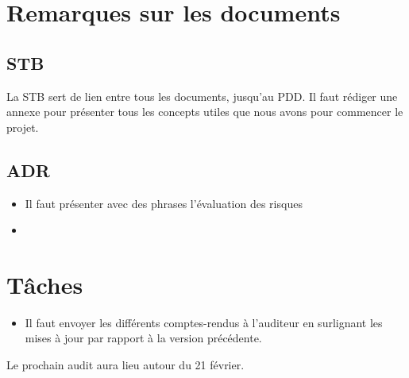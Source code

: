 \documentclass[a4paper,11pt,french]{article}
\begin{document}
\section{Remarques sur les documents}
\subsection{STB}
La STB sert de lien entre tous les documents, jusqu'au PDD.
Il faut rédiger une annexe pour présenter tous les concepts utiles que nous avons pour commencer le projet.

\subsection{ADR}
\begin{itemize}
\item Il faut présenter avec des phrases l'évaluation des risques
\item 
\end{itemize}


\section{Tâches}
\begin{itemize}
\item Il faut envoyer les différents comptes-rendus à l'auditeur en surlignant les mises à jour par rapport à la version précédente.
\end{itemize}

Le prochain audit aura lieu autour du 21 février.
\end{document}
